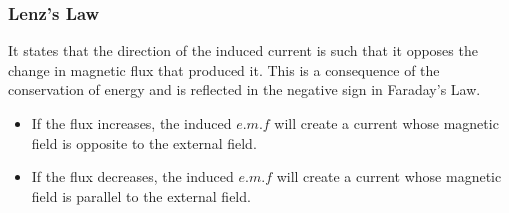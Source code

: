 \documentclass[a4paper,12pt]{article}
\begin{document}
\subsubsection*{Lenz's Law}
It states that the direction of the induced current is such that it opposes the change in magnetic flux that produced it. This is a consequence of the conservation of energy and is reflected in the negative sign in Faraday's Law.
\begin{itemize}
  \item If the flux increases, the induced $e.m.f$ will create a current whose magnetic field is opposite to the external field. 
  \item If the flux decreases, the induced $e.m.f$ will create a current whose magnetic field is parallel to the external field.
\end{itemize}
\end{document}
